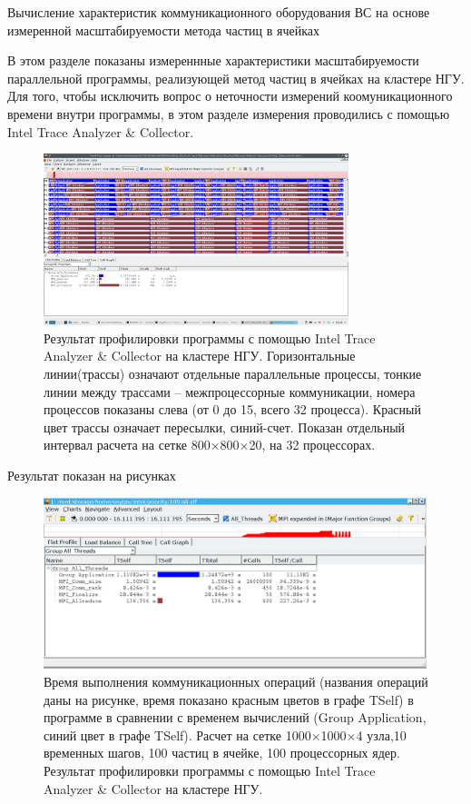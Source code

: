 {Вычисление характеристик коммуникационного оборудования ВС на основе измеренной масштабируемости метода частиц в ячейках}



В этом разделе показаны измереннные характеристики масштабируемости параллельной программы, реализующей метод частиц в ячейках на кластере НГУ. Для того, чтобы исключить вопрос о неточности измерений коомуникационного времени внутри программы, в этом разделе измерения проводились с помощью Intel Trace Analyzer \& Collector.

\begin{figure}[h]
	\begin{center}
		\includegraphics[height=5cm,keepaspectratio]{images/scalingNSU-img17.png}
		\caption{
			Результат профилировки программы с помощью Intel Trace Analyzer \& Collector на кластере НГУ. Горизонтальные линии(трассы) означают отдельные параллельные процессы, тонкие линии между трассами – межпроцессорные коммуникации, номера процессов показаны слева (от 0 до 15, всего 32 процесса). Красный цвет трассы означает пересылки, синий-счет. Показан отдельный интервал расчета на сетке 800×800×20, на 32 процессорах.
		}
		\label{scale8}
	\end{center} 
\end{figure}


Результат показан на рисунках 
\begin{figure}[h]
	\begin{center}
		\includegraphics[height=5cm,keepaspectratio]{images/scalingNSU-img18.png}
		\caption{
			Время выполнения коммуникационных операций (названия операций даны на рисунке, время показано красным цветов в графе TSelf) в программе в сравнении с временем вычислений (Group Application, синий цвет в графе TSelf). Расчет на сетке 1000×1000×4 узла,10 временных шагов, 100 частиц в ячейке,  100 процессорных ядер. Результат профилировки программы с помощью Intel Trace Analyzer \& Collector на кластере НГУ.
		}
		\label{scale9}
	\end{center} 
\end{figure}	    



